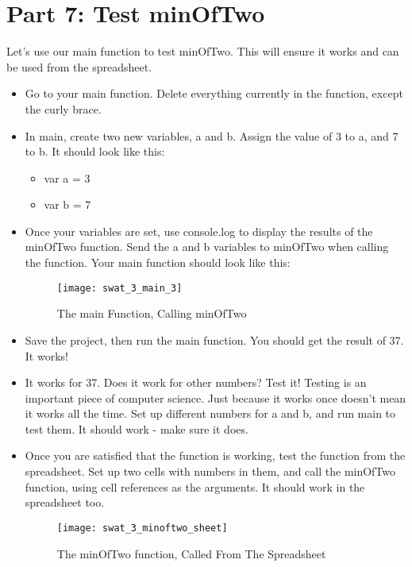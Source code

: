\documentclass{article}
\begin{document}
\section*{Part 7: Test minOfTwo}
Let's use our main function to test minOfTwo.  This will ensure it works and can be used from the spreadsheet.
\begin{itemize}
	\item Go to your main function.  Delete everything currently in the function, except the curly brace.
	\item In main, create two new variables, a and b.  Assign the value of 3 to a, and 7 to b.  It should look like this:
	\begin{itemize}
		\item var a = 3
		\item var b = 7
	\end{itemize}
	\item Once your variables are set, use console.log to display the results of the minOfTwo function.  Send the a and b variables to minOfTwo when calling the function.  Your main function should look like this:
	\begin{figure}[H]
  		\centering
  		\texttt{[image: swat\_3\_main\_3]}
  		\caption{The main Function, Calling minOfTwo}
	\end{figure}
	\item Save the project, then run the main function. You should get the result of 37.  It works!
	\item It works for 37.  Does it work for other numbers?  Test it!  Testing is an important piece of computer science.  Just because it works once doesn't mean it works all the time.  Set up different numbers for a and b, and run main to test them.  It should work - make sure it does.
	\item Once you are satisfied that the function is working, test the function from the spreadsheet.  Set up two cells with numbers in them, and call the minOfTwo function, using cell references as the arguments.  It should work in the spreadsheet too.
	\begin{figure}[H]
  		\centering
  		\texttt{[image: swat\_3\_minoftwo\_sheet]}
  		\caption{The minOfTwo function, Called From The Spreadsheet}
	\end{figure}
\end{itemize}
\end{document}
